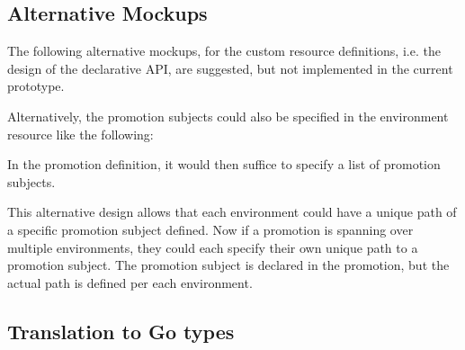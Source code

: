 \subsection{Alternative Mockups}
\label{prototype:design:alternative-mockups}

The following alternative mockups,
for the custom resource definitions,
i.e. the design of the declarative API,
are suggested, but not implemented in the current prototype.


Alternatively, the promotion subjects could also be specified
in the environment resource like the following:



In the promotion definition,
it would then suffice to specify
a list of promotion subjects.



This alternative design allows that each environment could have
a unique path of a specific promotion subject defined.
Now if a promotion is spanning over multiple environments,
they could each specify their own unique path to a promotion subject.
The promotion subject is declared in the promotion,
but the actual path is defined per each environment.

\subsection{Translation to Go types}
\label{prototype:design:go-types}

